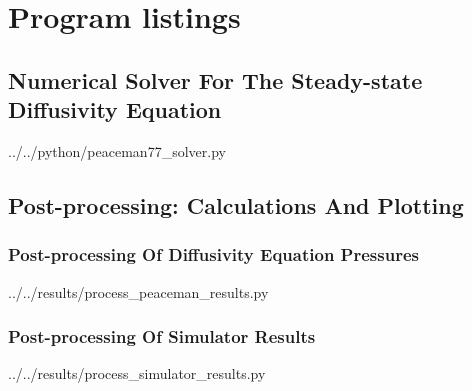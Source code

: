 \section{Program listings} %
\label{sec:program_listings}

\subsection{Numerical Solver For The Steady-state Diffusivity Equation} %
\label{sub:numerical_solver_for_the_steady_state_pressure_distribution_using_repeated_five_spot_pattern}


  {../../python/peaceman77_solver.py}

\clearpage
\subsection{Post-processing: Calculations And Plotting} %
\label{sub:postprocessing_calculations_and_plotting}

\subsubsection{Post-processing Of Diffusivity Equation Pressures} %
\label{ssub:postprocessing_of_peaceman_results}

  {../../results/process_peaceman_results.py}

\clearpage
\subsubsection{Post-processing Of Simulator Results} %
\label{ssub:postprocessing_of_simulator_results}

  {../../results/process_simulator_results.py}


